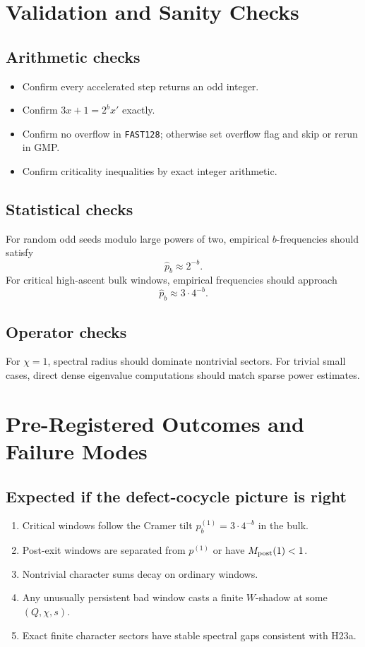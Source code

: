 \documentclass[11pt]{article}
\begin{document}
\section{Validation and Sanity Checks}

\subsection{Arithmetic checks}

\begin{itemize}
\item Confirm every accelerated step returns an odd integer.
\item Confirm \(3x+1=2^b x'\) exactly.
\item Confirm no overflow in \texttt{FAST128}; otherwise set overflow flag and skip or rerun in GMP.
\item Confirm criticality inequalities by exact integer arithmetic.
\end{itemize}

\subsection{Statistical checks}

For random odd seeds modulo large powers of two, empirical \(b\)-frequencies should satisfy
\[
        \widehat p_b\approx 2^{-b}.
\]
For critical high-ascent bulk windows, empirical frequencies should approach
\[
        \widehat p_b\approx3\cdot4^{-b}.
\]

\subsection{Operator checks}

For \(\chi=1\), spectral radius should dominate nontrivial sectors.  For trivial small cases, direct dense eigenvalue computations should match sparse power estimates.

\section{Pre-Registered Outcomes and Failure Modes}

\subsection{Expected if the defect-cocycle picture is right}

\begin{enumerate}
\item Critical windows follow the Cramer tilt \(p_b^{(1)}=3\cdot4^{-b}\) in the bulk.
\item Post-exit windows are separated from \(p^{(1)}\) or have \(M_{\rm post}(1)<1\).
\item Nontrivial character sums decay on ordinary windows.
\item Any unusually persistent bad window casts a finite \(W\)-shadow at some \((Q,\chi,s)\).
\item Exact finite character sectors have stable spectral gaps consistent with H23a.
\end{enumerate}
\end{document}
